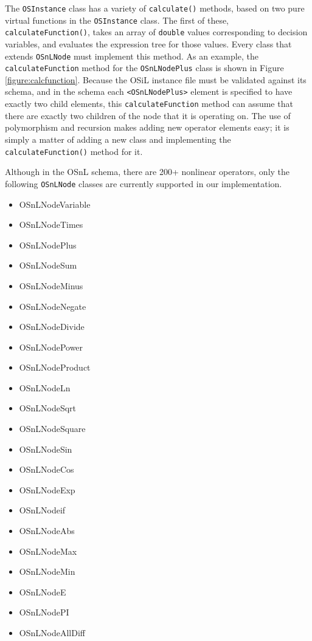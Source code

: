 \documentclass[11pt]{article}
\newcounter{Fig}
\renewcommand{\_}{{\char"5F}}
\renewcommand{\{}{{\char"7B}}
\renewcommand{\}}{{\char"7D}}
\renewcommand{\^}{{\char"0D}}
\renewcommand{\'}{{\char"0D}}
\begin{document}
    The {\tt OSInstance} class has a variety of {\tt calculate()} methods, based on two pure virtual functions in the {\tt OSInstance} class.  The first of these, {\tt calculateFunction()}, takes an array of {\tt double} values corresponding to decision variables, and evaluates the expression tree for those values.  Every class
that extends {\tt OSnLNode} must implement this method.  As an example, the {\tt calculateFunction} method for the {\tt OSnLNodePlus} class is shown in Figure \ref{figure:calcfunction}.  Because the OSiL instance file must be validated against its schema, and in the schema each {\tt <OSnLNodePlus>} element is specified to have exactly two child elements, this {\tt calculateFunction} method can assume that there are
exactly two children of the node that it is operating on.  The use of polymorphism and recursion makes adding new operator elements easy; it is simply a matter of adding a new class and implementing the {\tt
calculateFunction()} method for it.



Although in the OSnL schema, there are 200+ nonlinear operators, only the following {\tt  OSnLNode} classes are currently supported in our implementation.

\begin{itemize}
\item OSnLNodeVariable
\item OSnLNodeTimes
\item OSnLNodePlus
\item OSnLNodeSum
\item OSnLNodeMinus
\item OSnLNodeNegate
\item OSnLNodeDivide
\item OSnLNodePower
\item OSnLNodeProduct
\item OSnLNodeLn
\item OSnLNodeSqrt
\item OSnLNodeSquare
\item OSnLNodeSin
\item OSnLNodeCos
\item OSnLNodeExp
\item OSnLNodeif
\item OSnLNodeAbs
\item OSnLNodeMax
\item OSnLNodeMin
\item OSnLNodeE
\item OSnLNodePI
\item OSnLNodeAllDiff
\end{itemize}
\end{document}
